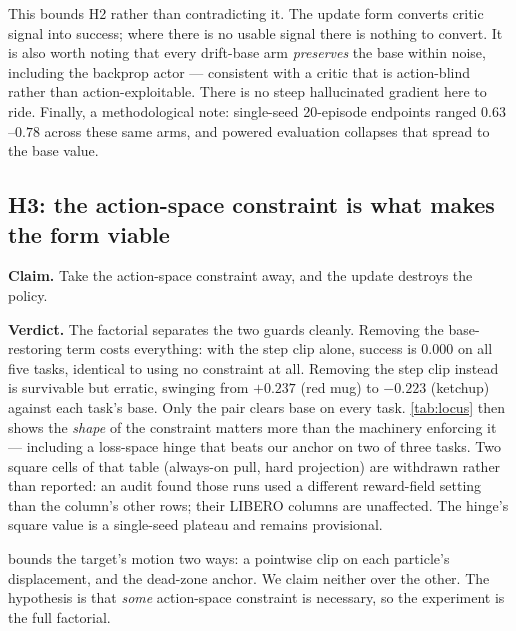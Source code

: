 This bounds H2 rather than contradicting it. The update form converts critic
signal into success; where there is no usable signal there is nothing to
convert. It is also worth noting that every drift-base arm \emph{preserves}
the base within noise, including the backprop actor --- consistent with a
critic that is action-blind rather than action-exploitable. There is no
steep hallucinated gradient here to ride. Finally, a methodological note:
single-seed 20-episode endpoints ranged $0.63$--$0.78$ across these same
arms, and powered evaluation collapses that spread to the base value.

\subsection{H3: the action-space constraint is what makes the form viable}
\label{sec:exp-constraint}

\textbf{Claim.} Take the action-space constraint away, and the update
destroys the policy.

\textbf{Verdict.} The factorial separates the two guards cleanly. Removing
the base-restoring term costs everything: with the step clip alone, success
is $0.000$ on all five tasks, identical to using no constraint at all.
Removing the step clip instead is survivable but erratic, swinging from
$+0.237$ (red mug) to $-0.223$ (ketchup) against each task's base. Only the
pair clears base on every task. \cref{tab:locus} then shows the \emph{shape}
of the constraint matters more than the machinery enforcing it --- including
a loss-space hinge that beats our anchor on two of three tasks. Two square
cells of that table (always-on pull, hard projection) are withdrawn rather
than reported: an audit found those runs used a different reward-field
setting than the column's other rows; their LIBERO columns are unaffected.
The hinge's square value is a single-seed plateau and remains provisional.

\method{} bounds the target's motion two ways: a pointwise clip on each
particle's displacement, and the dead-zone anchor. We claim neither over the
other. The hypothesis is that \emph{some} action-space constraint is
necessary, so the experiment is the full factorial.

